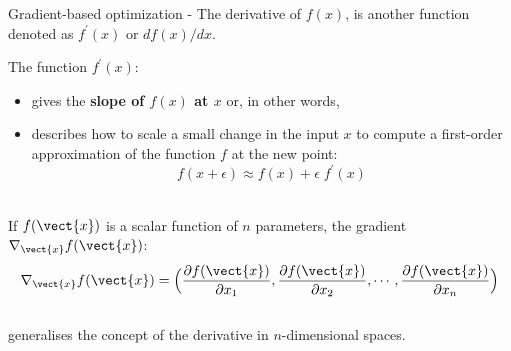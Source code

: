 \begin{frame}[t,allowframebreaks]{Gradient-based optimization -}
    The \gls{derivative} of $f(x)$, is another function 
    denoted as $f^\prime(x)$ or $df(x)/dx$.\\
    \vspace{0.3cm}
    
    The function $f^\prime(x)$:
    \begin{itemize}
        \item
        gives the {\bf slope of $f(x)$ at $x$} or, in other words,
        \item
        describes how to         
        scale a small change in the input $x$
        to compute a first-order approximation of the function $f$ at the new point:
        \begin{equation}
          f(x+\epsilon) \approx f(x) + \epsilon \; f^\prime(x)  
          \label{eq:deriv_1}
       \end{equation}\\
    \end{itemize}
    If $f(\vect{x})$
    is a scalar function of $n$ parameters,  
    the \gls{gradient} $\nabla_{\vect{x}} f(\vect{x})$:
    \begin{equation}
        \nabla_{\vect{x}} f(\vect{x}) = 
        \Big( 
            \frac{\partial f(\vect{x})}{\partial x_1},
            \frac{\partial f(\vect{x})}{\partial x_2},
            \cdots ,
            \frac{\partial f(\vect{x})}{\partial x_n}
        \Big)
        \label{eq:gradient_1}
     \end{equation}\\
     generalises the concept of the \gls{derivative} in $n$-dimensional spaces.

    \framebreak



\end{frame}
